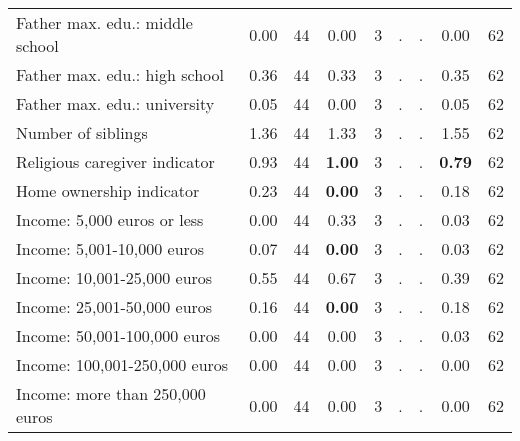 \begin{tabular}{l c c c c c c c c}
Father max. edu.: middle school &      0.00 &        44 &      0.00 &         3 &         . & . &      0.00 &        62 \\
Father max. edu.: high school &      0.36 &        44 &      0.33 &         3 &         . & . &      0.35 &        62 \\
Father max. edu.: university &      0.05 &        44 &      0.00 &         3 &         . & . &      0.05 &        62 \\
Number of siblings &      1.36 &        44 &      1.33 &         3 &         . & . &      1.55 &        62 \\
Religious caregiver indicator &      0.93 &        44 & \textbf{     1.00} &         3 &         . & . & \textbf{     0.79} &        62 \\
Home ownership indicator &      0.23 &        44 & \textbf{     0.00} &         3 &         . & . &      0.18 &        62 \\
Income: 5,000 euros or less &      0.00 &        44 &      0.33 &         3 &         . & . &      0.03 &        62 \\
Income: 5,001-10,000 euros &      0.07 &        44 & \textbf{     0.00} &         3 &         . & . &      0.03 &        62 \\
Income: 10,001-25,000 euros &      0.55 &        44 &      0.67 &         3 &         . & . &      0.39 &        62 \\
Income: 25,001-50,000 euros &      0.16 &        44 & \textbf{     0.00} &         3 &         . & . &      0.18 &        62 \\
Income: 50,001-100,000 euros &      0.00 &        44 &      0.00 &         3 &         . & . &      0.03 &        62 \\
Income: 100,001-250,000 euros &      0.00 &        44 &      0.00 &         3 &         . & . &      0.00 &        62 \\
Income: more than 250,000 euros &      0.00 &        44 &      0.00 &         3 &         . & . &      0.00 &        62 \\
\bottomrule
\end{tabular}
